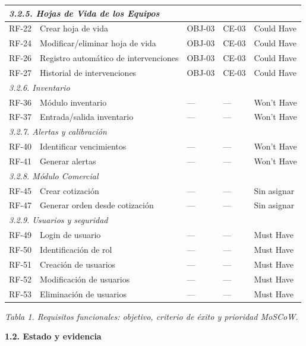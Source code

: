\documentclass[12pt,varwidth=170mm,border=10pt]{standalone}
\newcommand{\subsectiontitle}[1]{%
  \par\vspace{1.3ex}%
  {\normalfont\large\bfseries #1\par}%
  \vspace{0.5ex}%
}
\newcommand{\hueco}{---}
\newcommand{\tablecaption}[2]{%
  \par\vspace{0.4em}%
  \begin{center}
    \footnotesize\textit{Tabla #1. #2}
  \end{center}
  \vspace{1.0em}%
}
\begin{document}
\begin{center}
\begin{tabular}{|p{1.3cm}|p{5.3cm}|p{2.5cm}|p{2.1cm}|p{2.3cm}|}
\hline
\multicolumn{5}{|l|}{\textit{3.2.5. Hojas de Vida de los Equipos}} \\
\hline
RF-22 & Crear hoja de vida & OBJ-03 & CE-03 & Could Have \\
RF-24 & Modificar/eliminar hoja de vida & OBJ-03 & CE-03 & Could Have \\
RF-26 & Registro automático de intervenciones & OBJ-03 & CE-03 & Could Have \\
RF-27 & Historial de intervenciones & OBJ-03 & CE-03 & Could Have \\
\hline
\multicolumn{5}{|l|}{\textit{3.2.6. Inventario}} \\
\hline
RF-36 & Módulo inventario & \hueco{} & \hueco{} & Won't Have \\
RF-37 & Entrada/salida inventario & \hueco{} & \hueco{} & Won't Have \\
\hline
\multicolumn{5}{|l|}{\textit{3.2.7. Alertas y calibración}} \\
\hline
RF-40 & Identificar vencimientos & \hueco{} & \hueco{} & Won't Have \\
RF-41 & Generar alertas & \hueco{} & \hueco{} & Won't Have \\
\hline
\multicolumn{5}{|l|}{\textit{3.2.8. Módulo Comercial}} \\
\hline
RF-45 & Crear cotización & \hueco{} & \hueco{} & Sin asignar \\
RF-47 & Generar orden desde cotización & \hueco{} & \hueco{} & Sin asignar \\
\hline
\multicolumn{5}{|l|}{\textit{3.2.9. Usuarios y seguridad}} \\
\hline
RF-49 & Login de usuario & \hueco{} & \hueco{} & Must Have \\
RF-50 & Identificación de rol & \hueco{} & \hueco{} & Must Have \\
RF-51 & Creación de usuarios & \hueco{} & \hueco{} & Must Have \\
RF-52 & Modificación de usuarios & \hueco{} & \hueco{} & Must Have \\
RF-53 & Eliminación de usuarios & \hueco{} & \hueco{} & Must Have \\
\hline
\end{tabular}
\end{center}
\tablecaption{1}{Requisitos funcionales: objetivo, criterio de éxito y prioridad MoSCoW.}
\endgroup

\subsectiontitle{1.2. Estado y evidencia}
\end{document}
